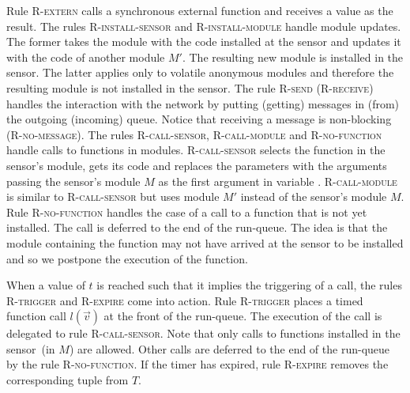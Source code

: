 \documentclass[copyright,creativecommons]{eptcs}
\newcommand{\selfk}{\text{self}}
\newcommand{\mkRrule}[1]{{\footnotesize \textsc{R-#1}}}
\newcommand{\RinstallS}{\mkRrule{install-sensor}}
\newcommand{\RinstallM}{\mkRrule{install-module}}
\newcommand{\RcallS}{\mkRrule{call-sensor}}
\newcommand{\RcallM}{\mkRrule{call-module}}
\newcommand{\Rnocall}{\mkRrule{no-function}}
\newcommand{\Rtrigger}{\mkRrule{trigger}}
\newcommand{\Rdiscard}{\mkRrule{expire}}
\newcommand{\Rsend}{\mkRrule{send}}
\newcommand{\Rreceive}{\mkRrule{receive}}
\newcommand{\Rsystem}{\mkRrule{extern}}
\newcommand{\RreceiveN}{\mkRrule{no-message}}
\begin{document}
Rule \Rsystem{} calls a synchronous external function and receives a
value as the result. The rules \RinstallS{} and \RinstallM{} handle
module updates. The former takes the module with the code installed at
the sensor and updates it with the code of another module $M'$. The
resulting new module is installed in the sensor. The latter applies
only to volatile anonymous modules and therefore the resulting module
is not installed in the sensor. The rule \Rsend{} (\Rreceive{})
handles the interaction with the network by putting (getting) messages
in (from) the outgoing (incoming) queue. Notice that receiving a 
message is non-blocking (\RreceiveN).
The rules \RcallS{}, \RcallM{} and \Rnocall{} handle calls to
functions in modules. \RcallS{} selects the function in the
sensor's module, gets its code and replaces the parameters with the
arguments passing the sensor's module $M$ as the first argument
in variable \selfk. \RcallM{} is similar to \RcallS{} but uses 
module $M'$ instead of the sensor's module $M$.
Rule \Rnocall{} handles the case of a call to a
function that is not yet installed. The call is deferred to the end of
the run-queue. The idea is that the module containing the function
may not have arrived at the sensor to be installed and so we postpone
the execution of the function.

When a value of $t$ is reached such that it implies the triggering of
a call, the rules \Rtrigger{} and \Rdiscard{} come into action. Rule
\Rtrigger{} places a timed function call $l(\vec v)$ at the front of
the run-queue. The execution of the call is delegated to rule
\RcallS{}. Note that only calls to functions installed in the
sensor~(in $M$) are allowed. Other calls are deferred to the end of the
run-queue by the rule \Rnocall{}. If the timer has expired, rule
\Rdiscard{} removes the corresponding tuple from $T$.
\end{document}

